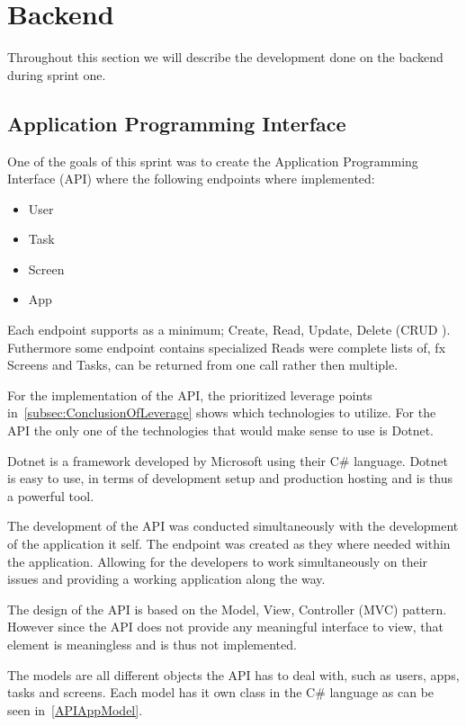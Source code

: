 \section{Backend}

Throughout this section we will describe the development done on the backend during sprint one.

\subsection{Application Programming Interface}

One of the goals of this sprint was to create the Application Programming Interface (API) where the following endpoints where implemented:

\begin{itemize}
    \item User
    \item Task
    \item Screen
    \item App
\end{itemize}

Each endpoint supports as a minimum; Create, Read, Update, Delete (CRUD \cite{CRUD}).
Futhermore some endpoint contains specialized Reads were complete lists of, fx Screens and Tasks, can be returned from one call rather then multiple. 

For the implementation of the API, the prioritized leverage points in~\autoref{subsec:ConclusionOfLeverage} shows which technologies to utilize.
For the API the only one of the technologies that would make sense to use is Dotnet.

Dotnet is a framework developed by Microsoft using their C\# language.
Dotnet is easy to use, in terms of development setup and production hosting and is thus a powerful tool.\cite{DotnetWebsite}

The development of the API was conducted simultaneously with the development of the application it self.
The endpoint was created as they where needed within the application.
Allowing for the developers to work simultaneously on their issues and providing a working application along the way.

The design of the API is based on the Model, View, Controller (MVC) pattern\cite{MVC}.
However since the API does not provide any meaningful interface to view, that element is meaningless and is thus not implemented.

The models are all different objects the API has to deal with, such as users, apps, tasks and screens.
Each model has it own class in the C\# language as can be seen in~\autoref{APIAppModel}.

